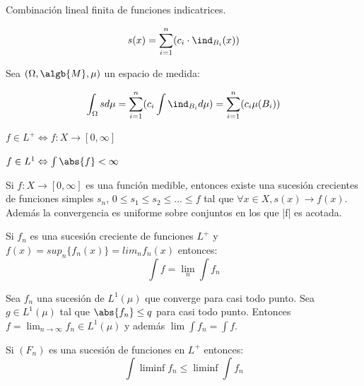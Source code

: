 \documentclass{apuntes}
\begin{document}
\begin{defn}
Combinación lineal finita de funciones indicatrices.

\[
s(x) = \sum_{i=1}^{n}(c_i \cdot \ind_{B_i}(x))
\]
\end{defn}

\begin{defn}
Sea $(\Omega,\algb{M},\mu)$ un espacio de medida:

\[\int_{\Omega} sd\mu = \sum_{i=1}^{n}(c_i \int \ind_{B_i} d\mu) = \sum_{i=1}^{n}(c_i \mu(B_i))\]
\end{defn}

\begin{defn}[Función $L^+$]
$f \in L^+ \Leftrightarrow f:X\rightarrow [0, \infty]$
\end{defn}

\begin{defn}[Función $L^1$]
$f \in L^1 \Leftrightarrow \int \abs{f} < \infty $
\end{defn}

\begin{defn}
Si $f:X \rightarrow [0, \infty]$ es una función medible, entonces existe una sucesión crecientes de funciones simples $s_n$, $0 \leq s_1 \leq s_2 \leq ... \leq f$ tal que $\forall x  \in X, s(x) \rightarrow f(x)$. Además la convergencia es uniforme sobre conjuntos en los que |f| es acotada.
\end{defn}

\begin{defn}
Si $f_n$ es una sucesión creciente de funciones $L^+$ y $f(x)=sup_n\{f_n(x)\}=lim_nf_n(x)$ entonces:
\[
\int f = \lim_n \int f_n
\]
\end{defn}

\begin{defn}
Sea $f_n$ una sucesión de $L^1(\mu)$ que converge para casi todo punto. Sea $g \in L^1(\mu)$ tal que $\abs{f_n} \leq q$ para casi todo punto. Entonces $f=\lim_{n \rightarrow \infty} f_n \in L^1(\mu)$ y además $\lim \int f_n = \int f$.
\end{defn}

\begin{defn}
Si $(F_n)$ es una sucesión de funciones en $L^+$ entonces:
\[
\int \liminf f_n \leq \liminf \int f_n
\]
\end{defn}
\end{document}
